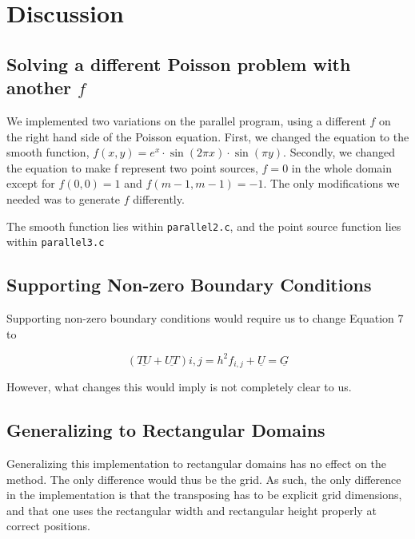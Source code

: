 \section{Discussion}

\subsection{Solving a different Poisson problem with another $f$}

We implemented two variations on the parallel program, using a different $f$ on
the right hand side of the Poisson equation. First, we changed the equation to
the smooth function, $f(x, y) = e^x \cdot \sin ( 2 \pi x) \cdot \sin (\pi y)$.
Secondly, we changed the equation to make f represent two point sources, $f = 0$
in the whole domain except for $f(0, 0) = 1$ and $f(m-1, m-1) = -1$. The only
modifications we needed was to generate $f$ differently.

The smooth function lies within {\tt parallel2.c}, and the point source function
lies within {\tt parallel3.c}

\subsection{Supporting Non-zero Boundary Conditions}

Supporting non-zero boundary conditions would require us to change Equation 7 to

\begin{equation}
  (\underline{TU} + \underline{UT})i,j = h^2f_{i,j} + \underline U = \underline{G}
\end{equation}

However, what changes this would imply is not completely clear to us.

\subsection{Generalizing to Rectangular Domains}
Generalizing this implementation to rectangular domains has no effect on the
method. The only difference would thus be the grid. As such, the only difference
in the implementation is that the transposing has to be explicit grid
dimensions, and that one uses the rectangular width and rectangular height
properly at correct positions.

